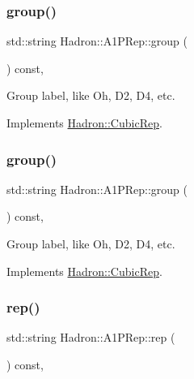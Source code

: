 \subsubsection{\texorpdfstring{group()}{group()}\hspace{0.1cm}{\footnotesize\ttfamily [2/3]}}
{\footnotesize\ttfamily std\+::string Hadron\+::\+A1\+P\+Rep\+::group (\begin{DoxyParamCaption}{ }\end{DoxyParamCaption}) const\hspace{0.3cm}{\ttfamily [inline]}, {\ttfamily [virtual]}}

Group label, like Oh, D2, D4, etc. 

Implements \mbox{\hyperlink{structHadron_1_1CubicRep_a0748f11ec87f387062c8e8981339a29c}{Hadron\+::\+Cubic\+Rep}}.

\mbox{\label{structHadron_1_1A1PRep_a62ee0e58d7e0763955b3c738cbcfdd4d}} 
\subsubsection{\texorpdfstring{group()}{group()}\hspace{0.1cm}{\footnotesize\ttfamily [3/3]}}
{\footnotesize\ttfamily std\+::string Hadron\+::\+A1\+P\+Rep\+::group (\begin{DoxyParamCaption}{ }\end{DoxyParamCaption}) const\hspace{0.3cm}{\ttfamily [inline]}, {\ttfamily [virtual]}}

Group label, like Oh, D2, D4, etc. 

Implements \mbox{\hyperlink{structHadron_1_1CubicRep_a0748f11ec87f387062c8e8981339a29c}{Hadron\+::\+Cubic\+Rep}}.

\mbox{\label{structHadron_1_1A1PRep_a8bacecde30050e482f468346bb51da28}} 
\subsubsection{\texorpdfstring{rep()}{rep()}\hspace{0.1cm}{\footnotesize\ttfamily [1/3]}}
{\footnotesize\ttfamily std\+::string Hadron\+::\+A1\+P\+Rep\+::rep (\begin{DoxyParamCaption}{ }\end{DoxyParamCaption}) const\hspace{0.3cm}{\ttfamily [inline]}, {\ttfamily [virtual]}}

